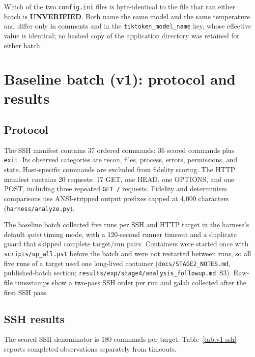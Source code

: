 \documentclass[a4paper,11pt]{article}
\begin{document}
Which of the two \texttt{config.ini} files is byte-identical to the file that
ran either batch is \textbf{UNVERIFIED}. Both name the same model and the same
temperature and differ only in comments and in the
\texttt{tiktoken\_model\_name} key, whose effective value is identical; no
hashed copy of the application directory was retained for either batch.

\section{Baseline batch (v1): protocol and results}

\subsection{Protocol}

The SSH manifest contains 37 ordered commands: 36 scored commands plus
\texttt{exit}. Its observed categories are recon, files, process, errors,
permissions, and state. Host-specific commands are excluded from fidelity
scoring. The HTTP manifest contains 20 requests: 17 GET, one HEAD,
one OPTIONS, and one POST, including three repeated \texttt{GET /} requests.
Fidelity and determinism comparisons use ANSI-stripped output prefixes capped
at 4,000 characters (\texttt{harness/analyze.py}).


The baseline batch collected five runs per SSH and HTTP target in the
harness's default \emph{quiet} timing mode, with a 120-second runner timeout
and a duplicate guard that skipped complete target/run pairs. Containers were
started once with \texttt{scripts/up\_all.ps1} before the batch and were not
restarted between runs, so all five runs of a target used one long-lived
container (\texttt{docs/STAGE2\_NOTES.md}, published-batch section;
\texttt{results/exp/stage4/analysis\_followup.md}~S3). Raw-file timestamps show
a two-pass SSH order per run and galah collected after the first SSH pass.

\subsection{SSH results}

The scored SSH denominator is 180 commands per target.
Table~\ref{tab:v1-ssh} reports completed observations separately from
timeouts.
\end{document}
